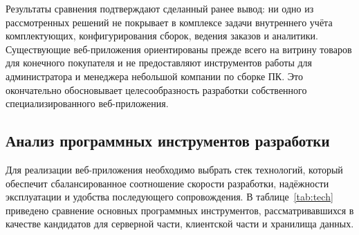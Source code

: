 \documentclass[14pt, a4paper]{extarticle}
\begin{document}
Результаты сравнения подтверждают сделанный ранее вывод: ни одно из рассмотренных решений не покрывает в комплексе задачи внутреннего учёта комплектующих, конфигурирования сборок, ведения заказов и аналитики. Существующие веб-приложения ориентированы прежде всего на витрину товаров для конечного покупателя и не предоставляют инструментов работы для администратора и менеджера небольшой компании по сборке ПК. Это окончательно обосновывает целесообразность разработки собственного специализированного веб-приложения.

\subsection{Анализ программных инструментов разработки}

Для реализации веб-приложения необходимо выбрать стек технологий, который обеспечит сбалансированное соотношение скорости разработки, надёжности эксплуатации и удобства последующего сопровождения. В таблице~\ref{tab:tech} приведено сравнение основных программных инструментов, рассматривавшихся в качестве кандидатов для серверной части, клиентской части и хранилища данных.
\end{document}
